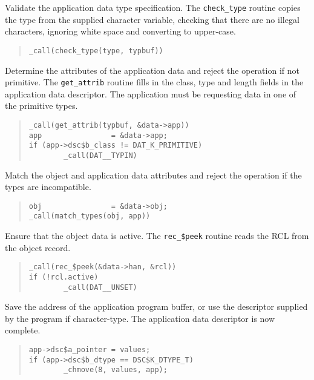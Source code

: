 Validate the application data type specification. The {\tt check\_type} routine
copies the type from the supplied character variable, checking that there are
no illegal characters, ignoring white space and converting to upper-case. 

\begin {quote}
\begin {verbatim}
_call(check_type(type, typbuf))
\end{verbatim}
\end {quote}

Determine the attributes of the application data and reject the operation if
not primitive. The {\tt get\_attrib} routine fills in the class, type and length
fields in the application data descriptor. The application must be requesting
data in one of the primitive types. 

\begin {quote}
\begin {verbatim}
_call(get_attrib(typbuf, &data->app))
app                = &data->app;
if (app->dsc$b_class != DAT_K_PRIMITIVE)
        _call(DAT__TYPIN)
\end{verbatim}
\end {quote}

Match the object and application data attributes and reject the operation if
the types are incompatible.

\begin {quote}
\begin {verbatim}
obj                = &data->obj;
_call(match_types(obj, app))
\end{verbatim}
\end {quote}

Ensure that the object data is active. The {\tt rec\_\$peek} routine reads the
RCL from the object record. 

\begin {quote}
\begin {verbatim}
_call(rec_$peek(&data->han, &rcl))
if (!rcl.active)
        _call(DAT__UNSET)
\end{verbatim}
\end {quote}

Save the address of the application program buffer, or use the descriptor
supplied by the program if character-type. The application data descriptor is
now complete. 

\begin {quote}
\begin {verbatim}
app->dsc$a_pointer = values;
if (app->dsc$b_dtype == DSC$K_DTYPE_T)
        _chmove(8, values, app);
\end{verbatim}
\end {quote}

